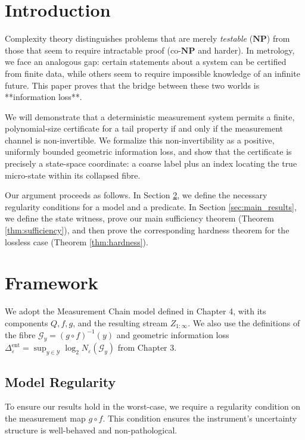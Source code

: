 \documentclass[12pt]{article}
\theoremstyle{definition}
\theoremstyle{plain}
\begin{document}
\section{Introduction}

Complexity theory distinguishes problems that are merely \emph{testable} ($\mathbf{NP}$) from those that seem to require intractable proof (co-$\mathbf{NP}$ and harder). In metrology, we face an analogous gap: certain statements about a system can be certified from finite data, while others seem to require impossible knowledge of an infinite future. This paper proves that the bridge between these two worlds is **information loss**.

We will demonstrate that a deterministic measurement system permits a finite, polynomial-size certificate for a tail property if and only if the measurement channel is non-invertible. We formalize this non-invertibility as a positive, uniformly bounded geometric information loss, and show that the certificate is precisely a state-space coordinate: a coarse label plus an index locating the true micro-state within its collapsed fibre.

Our argument proceeds as follows. In Section \ref{sec:framework}, we define the necessary regularity conditions for a model and a predicate. In Section \ref{sec:main_results}, we define the state witness, prove our main sufficiency theorem (Theorem \ref{thm:sufficiency}), and then prove the corresponding hardness theorem for the lossless case (Theorem \ref{thm:hardness}).

\section{Framework}\label{sec:framework}
We adopt the Measurement Chain model defined in Chapter 4, with its components $Q, f, g$, and the resulting stream $Z_{1:\infty}$. We also use the definitions of the fibre $\mathcal{G}_y = (g \circ f)^{-1}(y)$ and geometric information loss $\Delta^{\text{ent}}_\varepsilon = \sup_{y \in \mathcal{Y}} \log_2 N_\varepsilon(\mathcal{G}_y)$ from Chapter 3.

\subsection{Model Regularity}
To ensure our results hold in the worst-case, we require a regularity condition on the measurement map $g \circ f$. This condition ensures the instrument's uncertainty structure is well-behaved and non-pathological.
\end{document}
